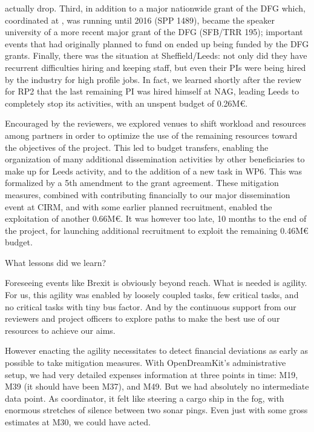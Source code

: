 actually drop. Third, in addition to a major nationwide grant of the
DFG which, coordinated at , was running until 2016 (SPP
1489),  became the speaker university of a more recent major
grant of the DFG (SFB/TRR 195); important events that  had
originally planned to fund on \ODK ended up being funded by the DFG
grants.
Finally, there was the situation at Sheffield/Leeds: not only did they have
recurrent difficulties hiring and keeping staff, but even their PIs
were being hired by the industry for high profile jobs. In fact, we
learned shortly after the review for RP2 that the last remaining PI
was hired himself at NAG, leading Leeds to completely stop its
activities, with an unspent budget of 0.26M€.

Encouraged by the reviewers, we explored venues to shift workload and
resources among partners in order to optimize the use of the remaining
resources toward the objectives of the project. This led to budget
transfers, enabling the organization of many additional dissemination
activities by other beneficiaries to make up for Leeds activity, and
to the addition of a new task in WP6. This was formalized by a 5th
amendment to the grant agreement. These mitigation measures, combined
with  contributing financially to our major dissemination
event at CIRM, and with some earlier planned recruitment, enabled the
exploitation of another 0.66M€. It was however too late, 10 months to
the end of the project, for launching additional recruitment to
exploit the remaining 0.46M€ budget.

What lessons did we learn?

Foreseeing events like Brexit is obviously beyond reach. What is
needed is agility. For us, this agility was enabled by loosely coupled
tasks, few critical tasks, and no critical tasks with tiny bus factor.
And by the continuous support from our reviewers and project officers
to explore paths to make the best use of our resources to achieve our
aims.

However enacting the agility necessitates to detect financial
deviations as early as possible to take mitigation measures. With
OpenDreamKit's administrative setup, we had very detailed expenses
information at three points in time: M19, M39 (it should have been
M37), and M49. But we had absolutely no intermediate data point. As
coordinator, it felt like steering a cargo ship in the fog, with
enormous stretches of silence between two sonar pings. Even just with
some gross estimates at M30, we could have acted.

